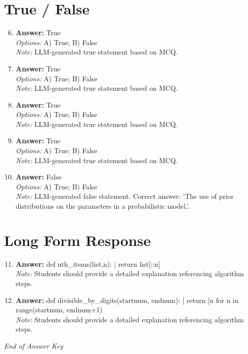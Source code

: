 \documentclass[12pt]{article}
\begin{document}
\section*{True / False}
\begin{enumerate}[label=\arabic*.]
\setcounter{enumi}{5}
\item \textbf{Answer:} True
\\ \textit{Options:} A) True; B) False
\\ \textit{Note:} LLM-generated true statement based on MCQ.
\item \textbf{Answer:} True
\\ \textit{Options:} A) True; B) False
\\ \textit{Note:} LLM-generated true statement based on MCQ.
\item \textbf{Answer:} True
\\ \textit{Options:} A) True; B) False
\\ \textit{Note:} LLM-generated true statement based on MCQ.
\item \textbf{Answer:} True
\\ \textit{Options:} A) True; B) False
\\ \textit{Note:} LLM-generated true statement based on MCQ.
\item \textbf{Answer:} False
\\ \textit{Options:} A) True; B) False
\\ \textit{Note:} LLM-generated false statement. Correct answer: 'The use of prior distributions on the parameters in a probabilistic model.'.
\end{enumerate}

\section*{Long Form Response}
\begin{enumerate}[label=\arabic*.]
\setcounter{enumi}{10}
\item \textbf{Answer:} def nth\_items(list,n): | return list[::n]
\\ \textit{Note:} Students should provide a detailed explanation referencing algorithm steps.
\item \textbf{Answer:} def divisible\_by\_digits(startnum, endnum): | return [n for n in range(startnum, endnum+1) \
\\ \textit{Note:} Students should provide a detailed explanation referencing algorithm steps.
\end{enumerate}

\vfill
\noindent\textit{End of Answer Key}
\end{document}
